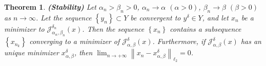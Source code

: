 \documentclass[a4paper,12pt]{article}
\newtheorem{theorem}{Theorem}[section]
\numberwithin{equation}{section}
\begin{document}

\begin{theorem}\label{the2.7}
    \textbf{(Stability)} Let $\alpha_{n}>\beta_{n}> 0$, $\alpha_{n}\rightarrow \alpha$ $\left(\alpha>0\right)$, $\beta_{n}\rightarrow \beta$ $\left(\beta>0\right)$ as $n\rightarrow\infty$. Let the sequence $\left\{y_{n}\right\}\subset Y$ be convergent to $y^{\delta}\in Y$, and let $x_{n}$ be a minimizer to $\mathcal{J}_{\alpha_{n},\beta_{n}}^{\delta_{n}}\left(x\right)$. Then the sequence $\left\{x_{n}\right\}$ contains a subsequence $\left\{x_{n_{k}}\right\}$ converging to a minimizer of $\mathcal{J}_{\alpha,\beta}^{\delta}\left(x\right)$. Furthermore, if $\mathcal{J}_{\alpha,\beta}^{\delta}(x)$ has an unique minimizer $x_{\alpha,\beta}^{\delta}$, then $\lim_{n\rightarrow +\infty}\left\|x_{n}- x_{\alpha,\beta}^{\delta}\right\|_{\ell_{2}}=0$.
\end{theorem}
\end{document}
